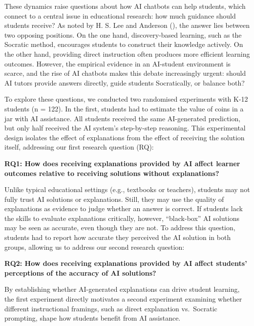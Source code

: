\documentclass[
  11pt,
]{article}
\begin{document}
These dynamics raise questions about how AI chatbots can help students, which connect to a central issue in educational research: how much guidance should students receive? As noted by H. S. Lee and Anderson (), the answer lies between two opposing positions. On the one hand, discovery-based learning, such as the Socratic method, encourages students to construct their knowledge actively. On the other hand, providing direct instruction often produces more efficient learning outcomes. However, the empirical evidence in an AI-student environment is scarce, and the rise of AI chatbots makes this debate increasingly urgent: should AI tutors provide answers directly, guide students Socratically, or balance both?

To explore these questions, we conducted two randomised experiments with K-12 students (n = 122). In the first, students had to estimate the value of coins in a jar with AI assistance. All students received the same AI-generated prediction, but only half received the AI system's step-by-step reasoning. This experimental design isolates the effect of explanations from the effect of receiving the solution itself, addressing our first research question (RQ):

\textbf{RQ1: How does receiving explanations provided by AI affect learner outcomes relative to receiving solutions without explanations?}

Unlike typical educational settings (e.g., textbooks or teachers), students may not fully trust AI solutions or explanations. Still, they may use the quality of explanations as evidence to judge whether an answer is correct. If students lack the skills to evaluate explanations critically, however, ``black-box'' AI solutions may be seen as accurate, even though they are not. To address this question, students had to report how accurate they perceived the AI solution in both groups, allowing us to address our second research question:

\textbf{RQ2: How does receiving explanations provided by AI affect students' perceptions of the accuracy of AI solutions?}

By establishing whether AI-generated explanations can drive student learning, the first experiment directly motivates a second experiment examining whether different instructional framings, such as direct explanation vs.~Socratic prompting, shape how students benefit from AI assistance.
\end{document}
